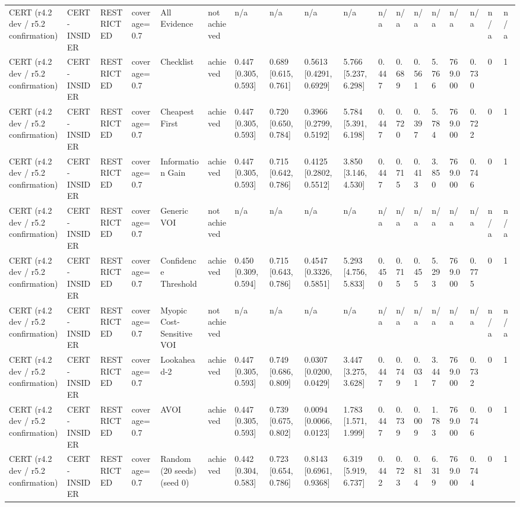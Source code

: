 \begin{table}[!ht]
{\begin{tabular}{llllllllllllllllll}
CERT (r4.2 dev / r5.2 confirmation) & CERT-INSIDER & RESTRICTED & coverage=0.7 & All Evidence & not achieved & n/a & n/a & n/a & n/a & n/a & n/a & n/a & n/a & n/a & n/a & n/a & n/a \\
CERT (r4.2 dev / r5.2 confirmation) & CERT-INSIDER & RESTRICTED & coverage=0.7 & Checklist & achieved & 0.447 [0.305, 0.593] & 0.689 [0.615, 0.761] & 0.5613 [0.4291, 0.6929] & 5.766 [5.237, 6.298] & 0.447 & 0.689 & 0.561 & 5.766 & 769.000 & 0.730 & 0 & 1 \\
CERT (r4.2 dev / r5.2 confirmation) & CERT-INSIDER & RESTRICTED & coverage=0.7 & Cheapest First & achieved & 0.447 [0.305, 0.593] & 0.720 [0.650, 0.784] & 0.3966 [0.2799, 0.5192] & 5.784 [5.391, 6.198] & 0.447 & 0.720 & 0.397 & 5.784 & 769.000 & 0.722 & 0 & 1 \\
CERT (r4.2 dev / r5.2 confirmation) & CERT-INSIDER & RESTRICTED & coverage=0.7 & Information Gain & achieved & 0.447 [0.305, 0.593] & 0.715 [0.642, 0.786] & 0.4125 [0.2802, 0.5512] & 3.850 [3.146, 4.530] & 0.447 & 0.715 & 0.413 & 3.850 & 769.000 & 0.746 & 0 & 1 \\
CERT (r4.2 dev / r5.2 confirmation) & CERT-INSIDER & RESTRICTED & coverage=0.7 & Generic VOI & not achieved & n/a & n/a & n/a & n/a & n/a & n/a & n/a & n/a & n/a & n/a & n/a & n/a \\
CERT (r4.2 dev / r5.2 confirmation) & CERT-INSIDER & RESTRICTED & coverage=0.7 & Confidence Threshold & achieved & 0.450 [0.309, 0.594] & 0.715 [0.643, 0.786] & 0.4547 [0.3326, 0.5851] & 5.293 [4.756, 5.833] & 0.450 & 0.715 & 0.455 & 5.293 & 769.000 & 0.775 & 0 & 1 \\
CERT (r4.2 dev / r5.2 confirmation) & CERT-INSIDER & RESTRICTED & coverage=0.7 & Myopic Cost-Sensitive VOI & not achieved & n/a & n/a & n/a & n/a & n/a & n/a & n/a & n/a & n/a & n/a & n/a & n/a \\
CERT (r4.2 dev / r5.2 confirmation) & CERT-INSIDER & RESTRICTED & coverage=0.7 & Lookahead-2 & achieved & 0.447 [0.305, 0.593] & 0.749 [0.686, 0.809] & 0.0307 [0.0200, 0.0429] & 3.447 [3.275, 3.628] & 0.447 & 0.749 & 0.031 & 3.447 & 769.000 & 0.732 & 0 & 1 \\
CERT (r4.2 dev / r5.2 confirmation) & CERT-INSIDER & RESTRICTED & coverage=0.7 & AVOI & achieved & 0.447 [0.305, 0.593] & 0.739 [0.675, 0.802] & 0.0094 [0.0066, 0.0123] & 1.783 [1.571, 1.999] & 0.447 & 0.739 & 0.009 & 1.783 & 769.000 & 0.746 & 0 & 1 \\
CERT (r4.2 dev / r5.2 confirmation) & CERT-INSIDER & RESTRICTED & coverage=0.7 & Random (20 seeds) (seed 0) & achieved & 0.442 [0.304, 0.583] & 0.723 [0.654, 0.786] & 0.8143 [0.6961, 0.9368] & 6.319 [5.919, 6.737] & 0.442 & 0.723 & 0.814 & 6.319 & 769.000 & 0.744 & 0 & 1 \\

\end{tabular}}
\end{table}

